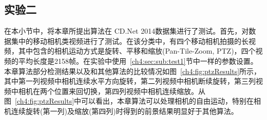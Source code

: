 \subsection{实验二}
\label{ch4:sec:sub:test2}
在本小节中，将本章所提出算法在 CD.Net 2014数据集\cite{CD2014}进行了测试。首先，对数据集中的移动相机类视频进行了测试。在该分类中，有四个移动相机拍摄的长视频，其中包含的相机运动方式是旋转、平移和缩放(Pan-Tile-Zoom, PTZ)，四个视频的平均长度是2158帧。在实验中使用~\ref{ch4:sec:sub:test1}节中一样的参数设置。本章算法部分检测结果以及和其他算法的比较情况如图~\ref{ch4:fig:ptzResults}所示，其中第一列视频中相机连续水平方向旋转，第二列视频中相机断续旋转，第三列视频中相机在两个位置来回切换，第四列视频中相机连续缩放。从图~\ref{ch4:fig:ptzResults}中可以看出，本章算法可以处理相机的自由运动，特别在相机连续旋转(第一列)及缩放(第四列)时得到的前景结果明显好于其他算法。\par

